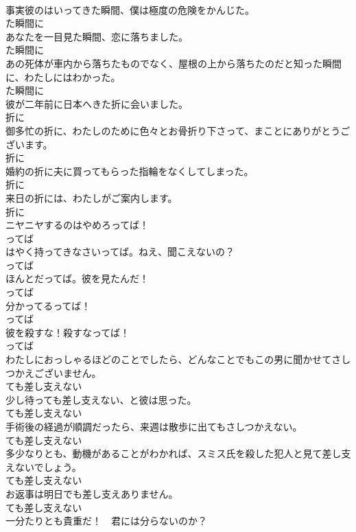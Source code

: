 \documentclass[8pt]{extreport}
\begin{document}
\begin{CJK}{UTF8}{min}
\\	事実彼のはいってきた瞬間、僕は極度の危険をかんじた。	
\\	た瞬間に
\\	あなたを一目見た瞬間、恋に落ちました。	
\\	た瞬間に
\\	あの死体が車内から落ちたものでなく、屋根の上から落ちたのだと知った瞬間に、わたしにはわかった。	
\\	た瞬間に
\\	彼が二年前に日本へきた折に会いました。	
\\	折に
\\	御多忙の折に、わたしのために色々とお骨折り下さって、まことにありがとうございます。	
\\	折に
\\	婚約の折に夫に買ってもらった指輪をなくしてしまった。	
\\	折に
\\	来日の折には、わたしがご案内します。	
\\	折に
\\	ニヤニヤするのはやめろってば！	
\\	ってば
\\	はやく持ってきなさいってば。ねえ、聞こえないの？	
\\	ってば
\\	ほんとだってば。彼を見たんだ！	
\\	ってば
\\	分かってるってば！	
\\	ってば
\\	彼を殺すな！殺すなってば！	
\\	ってば
\\	わたしにおっしゃるほどのことでしたら、どんなことでもこの男に聞かせてさしつかえございません。	
\\	ても差し支えない
\\	少し待っても差し支えない、と彼は思った。	
\\	ても差し支えない
\\	手術後の経過が順調だったら、来週は散歩に出てもさしつかえない。	
\\	ても差し支えない
\\	多少なりとも、動機があることがわかれば、スミス氏を殺した犯人と見て差し支えないでしょう。	
\\	ても差し支えない
\\	お返事は明日でも差し支えありません。	
\\	ても差し支えない
\\	一分たりとも貴重だ！　君には分らないのか？	

\end{CJK}
\end{document}
